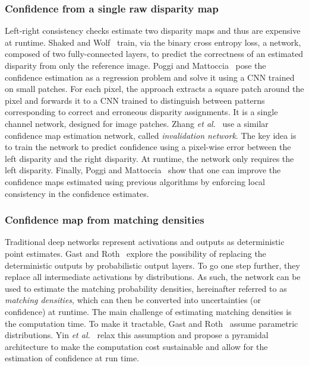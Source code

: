 \documentclass[10pt,journal,compsoc]{IEEEtran}
\newcommand{\etal}{\emph{et al.}}
\begin{document}
\subsubsection{Confidence from a single raw disparity map} 

Left-right consistency checks estimate two disparity maps and thus are expensive at runtime.  Shaked and Wolf~\cite{shaked2017improved} train, via the binary cross entropy loss, a network,  composed of two fully-connected layers,  to predict the correctness of an estimated disparity from only  the reference image.  Poggi and Mattoccia~\cite{poggi2016learningfrom} pose the confidence estimation as a regression problem and solve it using a CNN trained on small patches. For each pixel, the approach extracts a square patch around the pixel  and forwards it to a CNN trained to distinguish between patterns corresponding to correct and erroneous disparity assignments. It is a single channel network, designed for  image patches.  Zhang \etal~\cite{zhang2018activestereonet} use a similar confidence map estimation network, called  \emph{invalidation network}. The key idea is to train the network to predict confidence using a pixel-wise error between the left disparity and the right disparity. At runtime, the network only requires the left disparity.  Finally, Poggi and Mattoccia~\cite{poggi2017learning} show that one can improve the confidence maps estimated using previous algorithms by enforcing local consistency in the confidence estimates.





\subsubsection{Confidence map from matching densities}   Traditional deep networks represent  activations and outputs as deterministic point estimates. Gast and Roth~\cite{gast2018lightweight} explore the possibility of replacing the deterministic outputs by probabilistic output layers. To go one step further, they   replace all intermediate activations by distributions. As such, the network can be used to estimate the matching probability densities, hereinafter referred to as \emph{matching densities}, which can then be converted into uncertainties (or confidence) at runtime. The main challenge of estimating matching densities is the computation time.  To make it tractable, Gast and Roth~\cite{gast2018lightweight} assume parametric distributions.  Yin \etal~\cite{yin2019hierarchical} relax this assumption and propose a pyramidal architecture to make the computation cost sustainable and allow for the estimation of confidence at run time.
\end{document}
